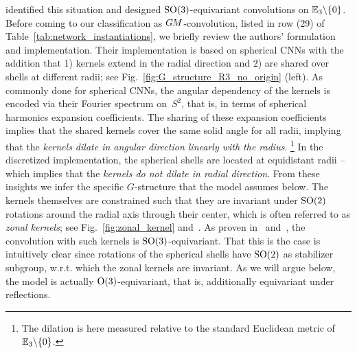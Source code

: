 \citet{ramasinghe2019representation} identified this situation and designed $\operatorname{SO}(3)$-equivariant convolutions on $\mathbb{E}_3 \backslash \{0\}$.
Before coming to our classification as $G\mkern-1.4muM$-convolution, listed in  row (29) of Table~\ref{tab:network_instantiations}, we briefly review the authors' formulation and implementation.
Their implementation is based on spherical CNNs with the addition that
1) kernels extend in the radial direction and
2) are shared over shells at different radii; see Fig.~\ref{fig:G_structure_R3_no_origin} (left).
As commonly done for spherical CNNs, the angular dependency of the kernels is encoded via their Fourier spectrum on~$S^2$, that is, in terms of spherical harmonics expansion coefficients.
The sharing of these expansion coefficients implies that the shared kernels cover the same solid angle for all radii, implying that the \emph{kernels dilate in angular direction linearly with the radius}.%
\footnote{
    The dilation is here measured relative to the standard Euclidean metric of $\mathbb{E}_3 \backslash \{0\}$.
}
In the discretized implementation, the spherical shells are located at equidistant radii -- which implies that the \emph{kernels do not dilate in radial direction}.
From these insights we infer the specific $G$-structure that the model assumes below.
The kernels themselves are constrained such that they are invariant under $\operatorname{SO}(2)$ rotations around the radial axis through their center, which is often referred to as \emph{zonal kernels};
see Fig.~\ref{fig:zonal_kernel} and~\cite{esteves2018zonalSpherical}.
As proven in~\cite{esteves2018zonalSpherical} and~\cite{ramasinghe2019representation}, the convolution with such kernels is $\operatorname{SO}(3)$-equivariant.
That this is the case is intuitively clear since rotations of the spherical shells have $\operatorname{SO}(2)$ as stabilizer subgroup, w.r.t. which the zonal kernels are invariant.
As we will argue below, the model is actually $\operatorname{O}(3)$-equivariant, that is, additionally equivariant under reflections.

